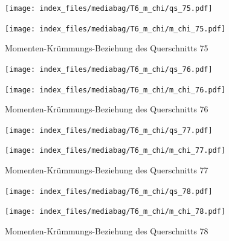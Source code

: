 \documentclass[
  11pt,
  letterpaper,
]{scrreprt}
\begin{document}
\begin{figure}[H]

\begin{minipage}{0.50\linewidth}
\texttt{[image: index\_files/mediabag/T6\_m\_chi/qs\_75.pdf]}\end{minipage}%
%
\begin{minipage}{0.50\linewidth}
\texttt{[image: index\_files/mediabag/T6\_m\_chi/m\_chi\_75.pdf]}\end{minipage}%

\caption{\label{fig-m_chi_appendix}Momenten-Krümmungs-Beziehung des
Querschnitts 75}

\end{figure}%

\begin{figure}[H]

\begin{minipage}{0.50\linewidth}
\texttt{[image: index\_files/mediabag/T6\_m\_chi/qs\_76.pdf]}\end{minipage}%
%
\begin{minipage}{0.50\linewidth}
\texttt{[image: index\_files/mediabag/T6\_m\_chi/m\_chi\_76.pdf]}\end{minipage}%

\caption{\label{fig-m_chi_appendix}Momenten-Krümmungs-Beziehung des
Querschnitts 76}

\end{figure}%

\begin{figure}[H]

\begin{minipage}{0.50\linewidth}
\texttt{[image: index\_files/mediabag/T6\_m\_chi/qs\_77.pdf]}\end{minipage}%
%
\begin{minipage}{0.50\linewidth}
\texttt{[image: index\_files/mediabag/T6\_m\_chi/m\_chi\_77.pdf]}\end{minipage}%

\caption{\label{fig-m_chi_appendix}Momenten-Krümmungs-Beziehung des
Querschnitts 77}

\end{figure}%

\begin{figure}[H]

\begin{minipage}{0.50\linewidth}
\texttt{[image: index\_files/mediabag/T6\_m\_chi/qs\_78.pdf]}\end{minipage}%
%
\begin{minipage}{0.50\linewidth}
\texttt{[image: index\_files/mediabag/T6\_m\_chi/m\_chi\_78.pdf]}\end{minipage}%

\caption{\label{fig-m_chi_appendix}Momenten-Krümmungs-Beziehung des
Querschnitts 78}

\end{figure}%
\end{document}
